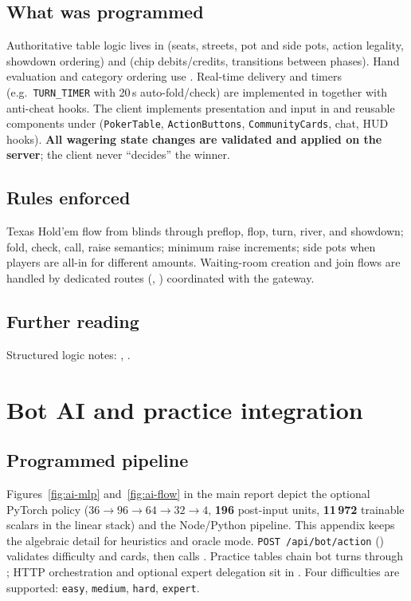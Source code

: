 \documentclass[11pt,a4paper]{article}
\begin{document}
\subsection{What was programmed}

Authoritative table logic lives in  (seats, streets, pot and side pots, action legality, showdown ordering) and  (chip debits/credits, transitions between phases). Hand evaluation and category ordering use . Real-time delivery and timers (e.g.\ \texttt{TURN\_TIMER} with 20\,s auto-fold/check) are implemented in  together with anti-cheat hooks. The client implements presentation and input in  and reusable components under  (\texttt{PokerTable}, \texttt{ActionButtons}, \texttt{CommunityCards}, chat, HUD hooks). \textbf{All wagering state changes are validated and applied on the server}; the client never ``decides'' the winner.

\subsection{Rules enforced}

Texas Hold'em flow from blinds through preflop, flop, turn, river, and showdown; fold, check, call, raise semantics; minimum raise increments; side pots when players are all-in for different amounts. Waiting-room creation and join flows are handled by dedicated routes (, ) coordinated with the gateway.

\subsection{Further reading}

Structured logic notes: , .

\section{Bot AI and practice integration}
\label{app:bots}

\subsection{Programmed pipeline}

Figures~\ref{fig:ai-mlp} and~\ref{fig:ai-flow} in the main report depict the optional PyTorch policy ($36\to96\to64\to32\to4$, \textbf{196} post-input units, \textbf{11\,972} trainable scalars in the linear stack) and the Node/Python pipeline. This appendix keeps the algebraic detail for heuristics and oracle mode. \texttt{POST /api/bot/action} () validates difficulty and cards, then calls . Practice tables chain bot turns through ; HTTP orchestration and optional expert delegation sit in . Four difficulties are supported: \texttt{easy}, \texttt{medium}, \texttt{hard}, \texttt{expert}.
\end{document}
